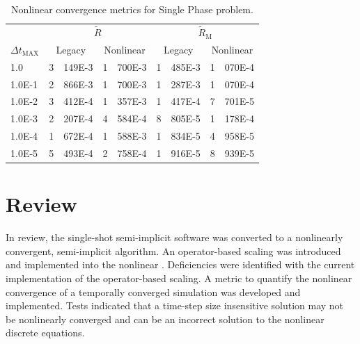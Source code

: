 \begin{table}[h!t]
\centering
\begin{tabular}{@{}l r@{.}l r@{.}l r@{.}l r@{.}l @{}}
\toprule
& \multicolumn{4}{c}{$\tilde{R}$} & \multicolumn{4}{c}{$\tilde{R}_{\text{M}}$}  \\
$\Delta t_{\text{MAX}}$ & \multicolumn{2}{c}{Legacy} & \multicolumn{2}{c}{Nonlinear} & \multicolumn{2}{c}{Legacy}& \multicolumn{2}{c}{Nonlinear}  \\
\midrule
1.0    & 3&149E-3 & 1&700E-3 & 1&485E-3 & 1&070E-4 \\
1.0E-1 & 2&866E-3 & 1&700E-3 & 1&287E-3 & 1&070E-4 \\
1.0E-2 & 3&412E-4 & 1&357E-3 & 1&417E-4 & 7&701E-5 \\
1.0E-3 & 2&207E-4 & 4&584E-4 & 8&805E-5 & 1&178E-4 \\
1.0E-4 & 1&672E-4 & 1&588E-3 & 1&834E-5 & 4&958E-5 \\
1.0E-5 & 5&493E-4 & 2&758E-4 & 1&916E-5 & 8&939E-5 \\
\bottomrule  
\end{tabular}
\caption{Nonlinear convergence metrics for Single Phase problem.}
\label{tab:single_criteria}
\end{table}

\section{Review}
\label{sect:review}

In review, the single-shot semi-implicit \cobra{} software was converted to a nonlinearly convergent, semi-implicit algorithm.
An operator-based scaling was introduced and implemented into the nonlinear \cobra{}.
Deficiencies were identified with the current implementation of the operator-based scaling.
A metric to quantify the nonlinear convergence of a temporally converged simulation was developed and implemented.
Tests indicated that a time-step size insensitive solution may not be nonlinearly converged and can be an incorrect solution to the nonlinear discrete equations.
